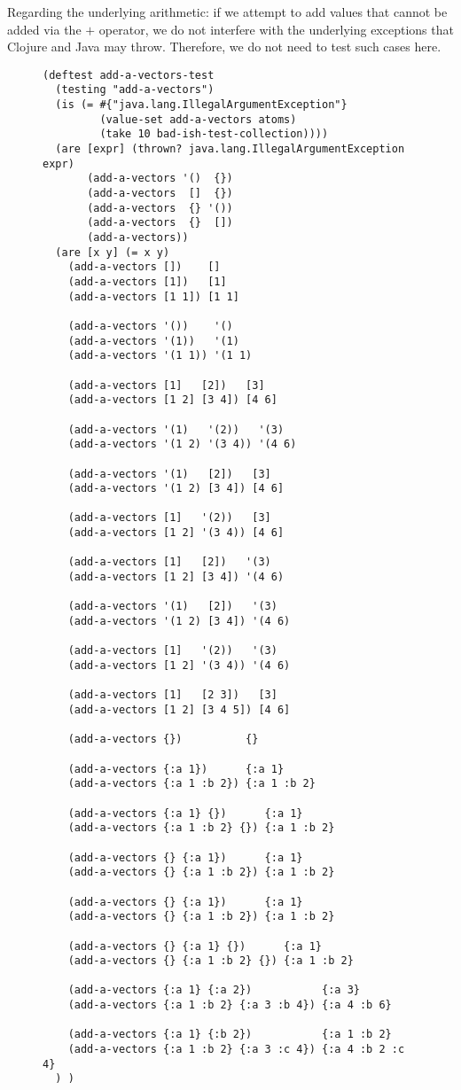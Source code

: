 \documentclass[11pt]{article}
\begin{document}
Regarding the underlying arithmetic: if we attempt to add values that
cannot be added via the $+$ operator, we do not interfere with the
underlying exceptions that Clojure and Java may throw. Therefore, we
do not need to test such cases here.

\begin{figure}[H]
\label{add-a-vectors-test}
\begin{verbatim}
(deftest add-a-vectors-test
  (testing "add-a-vectors")
  (is (= #{"java.lang.IllegalArgumentException"}
         (value-set add-a-vectors atoms)
         (take 10 bad-ish-test-collection))))
  (are [expr] (thrown? java.lang.IllegalArgumentException expr)
       (add-a-vectors '()  {})
       (add-a-vectors  []  {})
       (add-a-vectors  {} '())
       (add-a-vectors  {}  [])
       (add-a-vectors))
  (are [x y] (= x y)
    (add-a-vectors [])    []
    (add-a-vectors [1])   [1]
    (add-a-vectors [1 1]) [1 1]

    (add-a-vectors '())    '()
    (add-a-vectors '(1))   '(1)
    (add-a-vectors '(1 1)) '(1 1)

    (add-a-vectors [1]   [2])   [3]
    (add-a-vectors [1 2] [3 4]) [4 6]

    (add-a-vectors '(1)   '(2))   '(3)
    (add-a-vectors '(1 2) '(3 4)) '(4 6)

    (add-a-vectors '(1)   [2])   [3]
    (add-a-vectors '(1 2) [3 4]) [4 6]

    (add-a-vectors [1]   '(2))   [3]
    (add-a-vectors [1 2] '(3 4)) [4 6]

    (add-a-vectors [1]   [2])   '(3)
    (add-a-vectors [1 2] [3 4]) '(4 6)

    (add-a-vectors '(1)   [2])   '(3)
    (add-a-vectors '(1 2) [3 4]) '(4 6)

    (add-a-vectors [1]   '(2))   '(3)
    (add-a-vectors [1 2] '(3 4)) '(4 6)

    (add-a-vectors [1]   [2 3])   [3]
    (add-a-vectors [1 2] [3 4 5]) [4 6]

    (add-a-vectors {})          {}

    (add-a-vectors {:a 1})      {:a 1}
    (add-a-vectors {:a 1 :b 2}) {:a 1 :b 2}

    (add-a-vectors {:a 1} {})      {:a 1}
    (add-a-vectors {:a 1 :b 2} {}) {:a 1 :b 2}

    (add-a-vectors {} {:a 1})      {:a 1}
    (add-a-vectors {} {:a 1 :b 2}) {:a 1 :b 2}

    (add-a-vectors {} {:a 1})      {:a 1}
    (add-a-vectors {} {:a 1 :b 2}) {:a 1 :b 2}

    (add-a-vectors {} {:a 1} {})      {:a 1}
    (add-a-vectors {} {:a 1 :b 2} {}) {:a 1 :b 2}

    (add-a-vectors {:a 1} {:a 2})           {:a 3}
    (add-a-vectors {:a 1 :b 2} {:a 3 :b 4}) {:a 4 :b 6}

    (add-a-vectors {:a 1} {:b 2})           {:a 1 :b 2}
    (add-a-vectors {:a 1 :b 2} {:a 3 :c 4}) {:a 4 :b 2 :c 4}
  ) )
\end{verbatim}
\end{figure}
\end{document}
